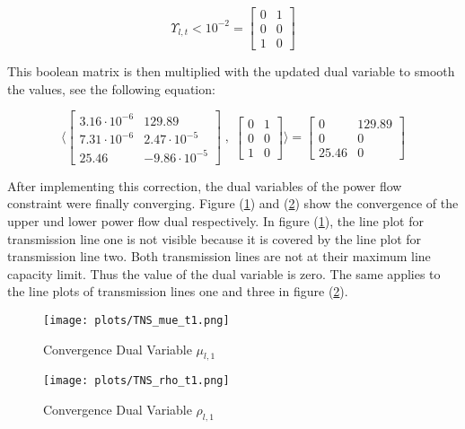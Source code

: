 \begin{equation}
	\Upsilon_{l,t} < 10^{-2} = \begin{bmatrix}
			0 & 1 \\
			0 & 0 \\
			1 & 0
		\end{bmatrix}
\end{equation}

 This boolean matrix is then multiplied with the updated dual variable to smooth the values, see the following equation:
 
 \begin{equation}
	 \langle \begin{bmatrix}
			3.16 \cdot 10^{-6} & 129.89 \\
			7.31 \cdot 10^{-6} & 2.47 \cdot 10^{-5} \\
			25.46 & -9.86 \cdot 10^{-5}
	\end{bmatrix} \; , \; \begin{bmatrix}
			0 & 1 \\
			0 & 0 \\
			1 & 0
		\end{bmatrix} \rangle = \begin{bmatrix}
			0 & 129.89 \\
			0 & 0 \\
			25.46 & 0
		\end{bmatrix}
\end{equation}
 
 After implementing this correction, the dual variables of the power flow constraint were finally converging. Figure (\ref{fig:conv-mue}) and (\ref{fig:conv-rho}) show the convergence of the upper und lower power flow dual respectively. In figure (\ref{fig:conv-mue}), the line plot for transmission line one is not visible because it is covered by the line plot for transmission line two. Both transmission lines are not at their maximum line capacity limit. Thus the value of the dual variable is zero. The same applies to the line plots of transmission lines one and three in figure (\ref{fig:conv-rho}).

\begin{figure}[h!]
	\centering
	\texttt{[image: plots/TNS\_mue\_t1.png]}
	\caption{Convergence Dual Variable $\mu_{l,1}$}
	\label{fig:conv-mue}
\end{figure}

\begin{figure}[h!]
	\centering
	\texttt{[image: plots/TNS\_rho\_t1.png]}
	\caption{Convergence Dual Variable $\rho_{l,1}$}
	\label{fig:conv-rho}
\end{figure}


